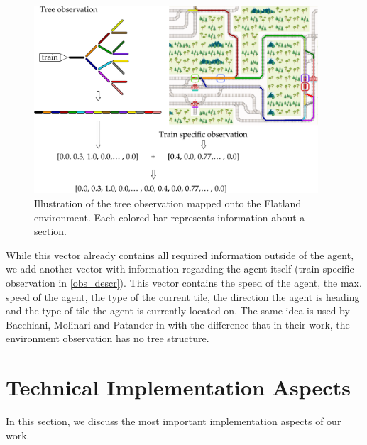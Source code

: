 \begin{figure}[H]
	\centering
	\includegraphics[width=300pt]{diagrams/tree_obs_mapping.pdf}
	\caption{Illustration of the tree observation mapped onto the Flatland environment. Each colored bar represents information about a section.}
	\label{fig:obs_descr}
\end{figure}
While this vector already contains all required information outside of the agent, we add another vector with information regarding the agent itself (train specific observation in \autoref{obs_descr}). This vector contains the speed of the agent, the max. speed of the agent, the type of the current tile, the direction the agent is heading and the type of tile the agent is currently located on. The same idea is used by Bacchiani, Molinari and Patander in \cite{marltraffica3c} with the difference that in their work, the environment observation has no tree structure.
\newpage
\section{Technical Implementation Aspects}\label{software}
In this section, we discuss the most important implementation aspects of our work. 
